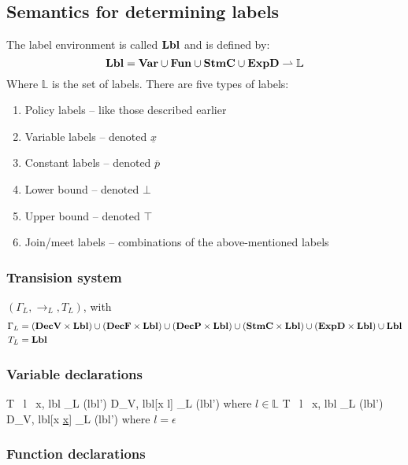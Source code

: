 \subsection{Semantics for determining labels}
The label environment is called $\mathbf{Lbl}$ and is defined by:
\[
  \mathbf{Lbl} = \mathbf{Var} \cup \mathbf{Fun} \cup \mathbf{StmC} \cup \mathbf{ExpD} \rightharpoonup \mathbb{L}
\]
Where $\mathbb{L}$ is the set of labels.
There are five types of labels:
\begin{enumerate}
  \item Policy labels -- like those described earlier
  \item Variable labels -- denoted $\underline{x}$
  \item Constant labels -- denoted $\overline{p}$
  \item Lower bound -- denoted $\bot$
  \item Upper bound -- denoted $\top$
  \item Join/meet labels -- combinations of the above-mentioned labels
\end{enumerate}

\subsubsection{Transision system}
$(\Gamma_{L}, \rightarrow_{L}, T_{L})$, with
\begin{align*}
  \Gamma_{L} & = (\mathbf{DecV} \times \mathbf{Lbl}) \cup (\mathbf{DecF} \times \mathbf{Lbl}) \cup (\mathbf{DecP} \times \mathbf{Lbl}) \cup (\mathbf{StmC} \times \mathbf{Lbl}) \cup (\mathbf{ExpD} \times \mathbf{Lbl}) \cup \mathbf{Lbl} \\
  T_{L} & = \mathbf{Lbl}
\end{align*}

\subsubsection{Variable declarations}

      {\langle T \, l \, x, lbl \rangle \rightarrow_L (lbl')}
      {\langle D_V, lbl[x \mapsto l] \rangle \rightarrow_L (lbl')}
      {where $l \in \mathbb{L}$}
      {\langle T \, l \, x, lbl \rangle \rightarrow_L (lbl')}
      {\langle D_V, lbl[x \mapsto \underline{x}] \rangle \rightarrow_L (lbl')}
      {where $l = \epsilon$}

\subsubsection{Function declarations}

